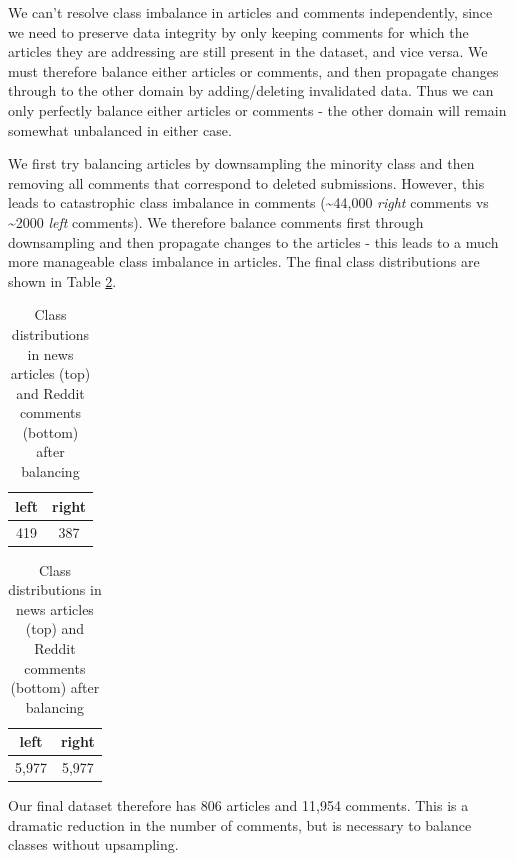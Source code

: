 We can't resolve class imbalance in articles and comments independently, since we need to preserve data integrity by only keeping comments for which the articles they are addressing are still present in the dataset, and vice versa. We must therefore balance either articles or comments, and then propagate changes through to the other domain by adding/deleting invalidated data. Thus we can only perfectly balance either articles or comments - the other domain will remain somewhat unbalanced in either case.

We first try balancing articles by downsampling the minority class and then removing all comments that correspond to deleted submissions. However, this leads to catastrophic class imbalance in comments (\textasciitilde 44,000 \textit{right} comments vs \textasciitilde 2000 \textit{left} comments). We therefore balance comments first through downsampling and then propagate changes to the articles - this leads to a much more manageable class imbalance in articles. The final class distributions are shown in Table \ref{tab:reddit-classes-after-balancing}.

\begin{table}[ht]
    \begin{center}
        \begin{tabular}{|c|c|}
            \hline
            left & right \\
            \hline
            419 & 387 \\
            \hline
        \end{tabular}
    \end{center} \vspace{5pt}
    \begin{center}
        \begin{tabular}{|c|c|}
            \hline
            left & right \\
            \hline
            5,977 & 5,977 \\
            \hline
        \end{tabular}
    \end{center}
    \caption{Class distributions in news articles (top) and Reddit comments (bottom) after balancing}
    \label{tab:reddit-classes-after-balancing}
\end{table}

Our final dataset therefore has 806 articles and 11,954 comments. This is a dramatic reduction in the number of comments, but is necessary to balance classes without upsampling.

